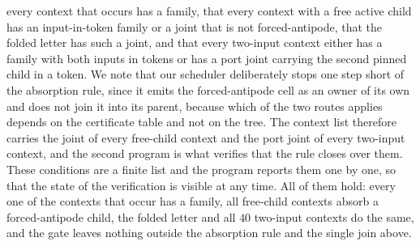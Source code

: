 \documentclass[11pt,a4paper]{article}
\theoremstyle{plain}
\theoremstyle{definition}
\theoremstyle{remark}
\begin{document}
every context that occurs has a family, that every context with a free active
child has an input-in-token family or a joint that is not forced-antipode,
that the folded letter has such a joint, and that every two-input context
either has a family with both inputs in tokens or has a port joint carrying
the second pinned child in a token.  We note that our scheduler deliberately
stops one step short of the absorption rule, since it emits the
forced-antipode cell as an owner of its own and does not join it into its
parent, because which of the two routes applies depends on the certificate
table and not on the tree.  The context list therefore carries the joint of
every free-child context and the port joint of every two-input context, and
the second program is what verifies that the rule closes over them.  These
conditions are a finite list and the program reports them one by one, so that
the state of the verification is visible at any time.  All of them hold: every
one of the \NumEmittable{} contexts that occur has a family, all
\NumFreeChildContexts{} free-child contexts absorb a forced-antipode child,
the folded letter and all $40$ two-input contexts do the same, and the gate
leaves nothing outside the absorption rule and the single join above.
\end{document}

